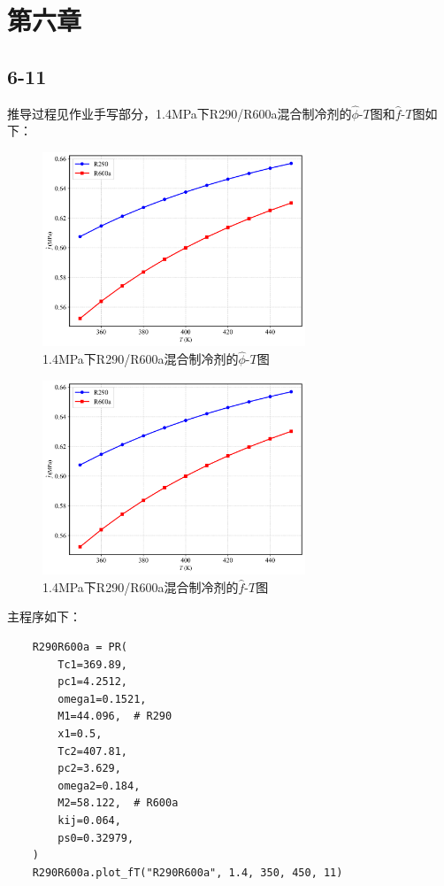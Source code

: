 \documentclass[12pt,a4paper]{article}
\begin{document}
\section*{第六章}
\subsection*{6-11}

推导过程见作业手写部分，1.4MPa下R290/R600a混合制冷剂的$\hat{\phi}$-$T$图和$\hat{f}$-$T$图如下：
\begin{figure}[H]
    \centering
    \includegraphics[width=0.7\textwidth]{R290R600a_f.png}
    \caption{1.4MPa下R290/R600a混合制冷剂的$\hat{\phi}$-$T$图}
\end{figure}

\begin{figure}[H]
    \centering
    \includegraphics[width=0.7\textwidth]{R290R600a_f.png}
    \caption{1.4MPa下R290/R600a混合制冷剂的$\hat{f}$-$T$图}
\end{figure}

主程序如下：
\begin{lstlisting}
    R290R600a = PR(
        Tc1=369.89,
        pc1=4.2512,
        omega1=0.1521,
        M1=44.096,  # R290
        x1=0.5,
        Tc2=407.81,
        pc2=3.629,
        omega2=0.184,
        M2=58.122,  # R600a
        kij=0.064,
        ps0=0.32979,
    )
    R290R600a.plot_fT("R290R600a", 1.4, 350, 450, 11)
\end{lstlisting}
\end{document}
